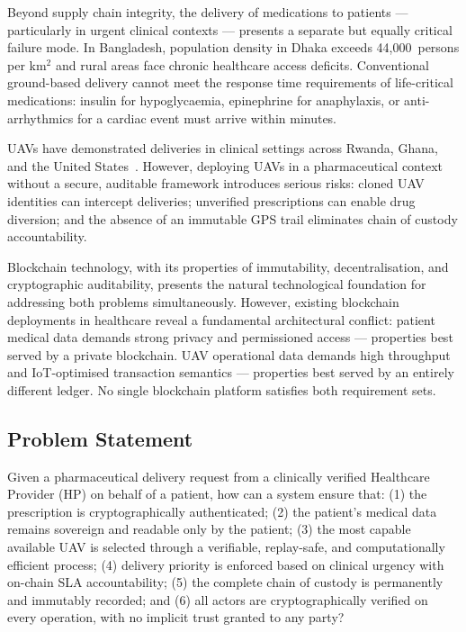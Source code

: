 \documentclass[sigplan,screen,review=false]{acmart}
\begin{document}
Beyond supply chain integrity, the delivery of medications to
patients --- particularly in urgent clinical contexts --- presents a
separate but equally critical failure mode. In Bangladesh, population
density in Dhaka exceeds 44,000~persons per km$^2$ and rural areas
face chronic healthcare access deficits. Conventional ground-based
delivery cannot meet the response time requirements of life-critical
medications: insulin for hypoglycaemia, epinephrine for anaphylaxis,
or anti-arrhythmics for a cardiac event must arrive within minutes.

UAVs have demonstrated deliveries in clinical settings across Rwanda,
Ghana, and the United States~\cite{zipline2022report,thiels2015uav}.
However, deploying UAVs in a pharmaceutical context without a secure,
auditable framework introduces serious risks: cloned UAV identities can
intercept deliveries; unverified prescriptions can enable drug
diversion; and the absence of an immutable GPS trail eliminates chain
of custody accountability.

Blockchain technology, with its properties of immutability,
decentralisation, and cryptographic auditability, presents the natural
technological foundation for addressing both problems simultaneously.
However, existing blockchain deployments in healthcare reveal a
fundamental architectural conflict: patient medical data demands strong
privacy and permissioned access --- properties best served by a private
blockchain. UAV operational data demands high throughput and
IoT-optimised transaction semantics --- properties best served by an
entirely different ledger. No single blockchain platform satisfies both
requirement sets.

\subsection{Problem Statement}

Given a pharmaceutical delivery request from a clinically verified
Healthcare Provider (HP) on behalf of a patient, how can a system
ensure that: (1) the prescription is cryptographically authenticated;
(2) the patient's medical data remains sovereign and readable only by
the patient; (3) the most capable available UAV is selected through a
verifiable, replay-safe, and computationally efficient process;
(4) delivery priority is enforced based on clinical urgency with
on-chain SLA accountability; (5) the complete chain of custody is
permanently and immutably recorded; and (6) all actors are
cryptographically verified on every operation, with no implicit trust
granted to any party?
\end{document}
